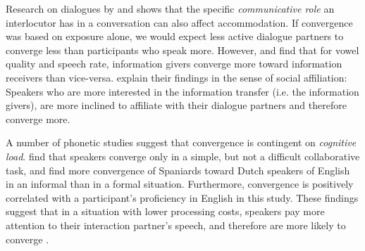 \documentclass[output=paper,
modfonts
]{langscibook}
\begin{document}
Research on dialogues by \cite{pardo_phonetic_2006} and \cite{pardo_phonetic_2013} shows that the specific \textit{communicative role} an interlocutor has in a conversation can also affect accommodation. If convergence was based on exposure alone, we would expect less active dialogue partners to converge less than participants who speak more. However, \cite{pardo_phonetic_2006} and \cite{pardo_phonetic_2013} find that for vowel quality and speech rate, information givers converge more toward information receivers than vice-versa. \cite{pardo_phonetic_2013} explain their findings in the sense of social affiliation: Speakers who are more interested in the information transfer (i.e. the information givers), are more inclined to affiliate with their dialogue partners and therefore converge more.
% 
% 
% 
% 
% 
%

A number of phonetic studies suggest that convergence is contingent on \textit{cognitive load}. \cite{abel_cognitive_2016} find that speakers converge only in a simple, but not a difficult collaborative task, and \cite{berry_phonetic_2017} find more convergence of Spaniards toward Dutch speakers of English in an informal than in a formal situation. Furthermore, convergence is positively correlated with a participant's proficiency in English in this study. These findings suggest that in a situation with lower processing costs, speakers pay more attention to their interaction partner's speech, and therefore are more likely to converge \citep{yu_phonetic_2013,abel_phonetic_2011,berry_phonetic_2017}. 
% 
% 


\end{document}
